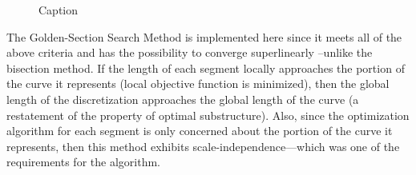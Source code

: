 \documentclass[preprint,12pt]{elsarticle}
\begin{document}
\begin{figure}[h!]
  \caption{\label{OptimizationFunctionExample} Caption}
\end{figure}

The Golden-Section Search Method is implemented here since it meets all of the above criteria and has the possibility to converge superlinearly \cite{brent73}--unlike the bisection method.  If the length of each segment locally approaches the portion of the curve it represents (local objective function is minimized), then the global length of the discretization approaches the global length of the curve (a restatement of the property of optimal substructure).  Also, since the optimization algorithm for each segment is only concerned about the portion of the curve it represents, then this method exhibits scale-independence—which was one of the requirements for the algorithm.
\end{document}
